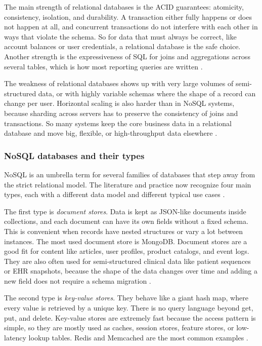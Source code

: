 The main strength of relational databases is the ACID guarantees: atomicity, consistency, isolation, and durability. A transaction either fully happens or does not happen at all, and concurrent transactions do not interfere with each other in ways that violate the schema. So for data that must always be correct, like account balances or user credentials, a relational database is the safe choice. Another strength is the expressiveness of SQL for joins and aggregations across several tables, which is how most reporting queries are written \autocite{khan2022sqlnosql, hassan2024big_data_db}.

The weakness of relational databases shows up with very large volumes of semi-structured data, or with highly variable schemas where the shape of a record can change per user. Horizontal scaling is also harder than in NoSQL systems, because sharding across servers has to preserve the consistency of joins and transactions. So many systems keep the core business data in a relational database and move big, flexible, or high-throughput data elsewhere \autocite{hassan2024big_data_db, nasution2023relational_nosql}.

\subsubsection{NoSQL databases and their types}
\label{sec:nosql-types}

NoSQL is an umbrella term for several families of databases that step away from the strict relational model. The literature and practice now recognize four main types, each with a different data model and different typical use cases \autocite{aguilar2023nosql_slr, gajiwala2024nosql_review, moniruzzaman2013nosql, asaad2020nosql}.

The first type is \emph{document stores}. Data is kept as JSON-like documents inside collections, and each document can have its own fields without a fixed schema. This is convenient when records have nested structures or vary a lot between instances. The most used document store is MongoDB. Document stores are a good fit for content like articles, user profiles, product catalogs, and event logs. They are also often used for semi-structured clinical data like patient sequences or EHR snapshots, because the shape of the data changes over time and adding a new field does not require a schema migration \autocite{aguilar2023nosql_slr, silalahi2018mongo_mysql, gyorodi2015nosql_web}.

The second type is \emph{key-value stores}. They behave like a giant hash map, where every value is retrieved by a unique key. There is no query language beyond get, put, and delete. Key-value stores are extremely fast because the access pattern is simple, so they are mostly used as caches, session stores, feature stores, or low-latency lookup tables. Redis and Memcached are the most common examples \autocite{srai2023redis_mda, li2018surfing_redis}.

